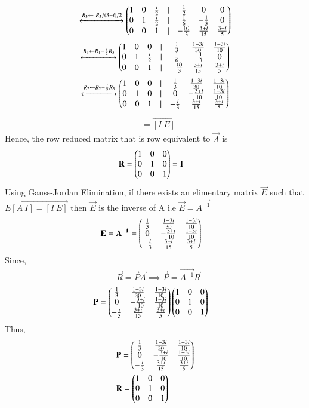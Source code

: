 \begin{align}
\xleftrightarrow[]{R_3 \leftarrow \ R_3/(3-i)/2}
                \begin{pmatrix} 1 & 0 & \frac{i}{2} &| & \frac{1}{2} & 0 & 0 \\
			0 & 1 & \frac{i}{2}&| & \frac{1}{6} & -\frac{1}{3} & 0 \\
			0 & 0 & 1&| &-\frac{(i)}{3} & \frac{3+i}{15} & \frac{3+i}{5}\end{pmatrix}
\end{align}
\begin{align}
\xleftrightarrow[]{R_1 \leftarrow R_1-\frac{i}{2}R_3}
                \begin{pmatrix} 1 & 0 & 0 &| & \frac{1}{3} & \frac{1-3i}{30} & \frac{1-3i}{10} \\
			0 & 1 & \frac{i}{2}&| & \frac{1}{6} & -\frac{1}{3} & 0 \\
			0 & 0 & 1&| &-\frac{(i)}{3} & \frac{3+i}{15} & \frac{3+i}{5}\end{pmatrix}
\end{align}
\begin{align}
\xleftrightarrow[]{R_2 \leftarrow R_2-\frac{i}{2}R_3}
                \begin{pmatrix} 1 & 0 & 0 &| & \frac{1}{3} & \frac{1-3i}{30} & \frac{1-3i}{10} \\
			0 & 1 & 0 &| & 0 & -\frac{3+i}{10}& \frac{1-3i}{10} \\
			0 & 0 & 1&| &-\frac{i}{3} & \frac{3+i}{15} & \frac{3+i}{5}\end{pmatrix}			
\end{align}
\begin{align}
&= \vec{[I \ E]}\nonumber
\end{align}
Hence, the row reduced matrix that is row equivalent to $\vec{A}$ is 
\begin{align}
& \mathbf{R}=\begin{pmatrix}1&0&0\\0&1&0\\0&0&1\end{pmatrix}=\mathbf{I}\label{eq:solutions/1/5/2/eq1}
\end{align}
Using Gauss-Jordan Elimination,
if there exists an elimentary matrix $\vec{E}$ such that $\vec{E[A \ I]=[I \ E]}$ then $\vec{E}$ is the inverse of A i.e $\vec{E}=\vec{A^{-1}}$
\begin{align}\label{eq:solutions/1/5/2/eq2}
    &  \mathbf{E} = \mathbf{A^{-1}} = \begin{pmatrix} \frac{1}{3}&\frac{1-3i}{30}&\frac{1-3i}{10}\\0 & -\frac{3+i}{10}&\frac{1-3i}{10} \\
                        -\frac{i}{3} & \frac{3+i}{15} & \frac{3+i}{5}\end{pmatrix}
\end{align}
Since,
\begin{align}
    & \vec{R}=\vec{P}\vec{A}
    \implies \vec{P}=\vec{A^{-1}}\vec{R}
\end{align}
\begin{align}
&\mathbf{P}= \begin{pmatrix} \frac{1}{3}&\frac{1-3i}{30}&\frac{1-3i}{10}\\0 & -\frac{3+i}{10}&\frac{1-3i}{10} \\
                        -\frac{i}{3} & \frac{3+i}{15} & \frac{3+i}{5}\end{pmatrix} \begin{pmatrix}1&0&0\\0&1&0\\0&0&1\end{pmatrix}
\end{align}
Thus,
\begin{align}
& \mathbf{P}= \begin{pmatrix} \frac{1}{3}&\frac{1-3i}{30}&\frac{1-3i}{10}\\0 & -\frac{3+i}{10}&\frac{1-3i}{10} \\
                        -\frac{i}{3} & \frac{3+i}{15} & \frac{3+i}{5}\end{pmatrix}\nonumber\\
& \mathbf{R}=\begin{pmatrix}1&0&0\\0&1&0\\0&0&1\end{pmatrix}\nonumber
\end{align}

